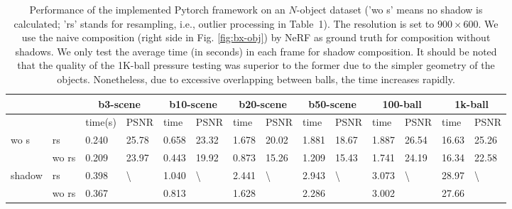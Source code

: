 \documentclass[letterpaper]{article}
\begin{document}
\begin{table}[tbp]
\begin{adjustbox}{width=0.16\columnwidth}
\begin{tabular}{ll|ll|ll|ll|ll|ll|ll}
\hline
 &
 &
  \multicolumn{2}{c|}{b3-scene} &
  \multicolumn{2}{c|}{b10-scene} &
  \multicolumn{2}{c|}{b20-scene} &
  \multicolumn{2}{c|}{b50-scene} &
  \multicolumn{2}{c|}{100-ball} &
  \multicolumn{2}{c}{1k-ball} \\ \hline
                             &        & time(s) & PSNR & time & PSNR & time & PSNR & time & PSNR & time & PSNR & time & PSNR \\ \hline
\multirow{2}{*}{wo s}        & rs & 0.240    & 25.78       & 0.658    & 23.32       & 1.678    & 20.02      & 1.881    & 18.67       & 1.887    & 26.54   & 16.63    & 25.26       \\
                             & wo rs   & 0.209    & 23.97    & 0.443    & 19.92   & 0.873    & 15.26   & 1.209    &  15.43  & 1.741    & 24.19   & 16.34    & 22.58       \\
\multirow{2}{*}{shadow} & rs & 0.398    & \multirow{2}{*}{\textbackslash}       & 1.040    & \multirow{2}{*}{\textbackslash}       & 2.441    & \multirow{2}{*}{\textbackslash}       & 2.943    & \multirow{2}{*}{\textbackslash}       & 3.073    & \multirow{2}{*}{\textbackslash}       & 28.97    & \multirow{2}{*}{\textbackslash}       \\
                             & wo rs   & 0.367    &        & 0.813    &        & 1.628    &        & 2.286    &        & 3.002    &       & 27.66  &        \\
\hline
\end{tabular}
\end{adjustbox}
\caption{Performance of the implemented Pytorch framework on an $N$-object dataset ('wo s' means no shadow is calculated; 'rs' stands for resampling, i.e., outlier processing in Table~1). The resolution is set to $900\times600$. We use the naive composition (right side in Fig. \ref{fig:bx-obj}) by NeRF as ground truth for composition without shadows. We only test the average time (in seconds) in each frame for shadow composition. It should be noted that the quality of the 1K-ball pressure testing was superior to the former due to the simpler geometry of the objects. Nonetheless, due to excessive overlapping between balls, the time increases rapidly.}
\label{tab:bxobj}
\end{table}
\end{document}
